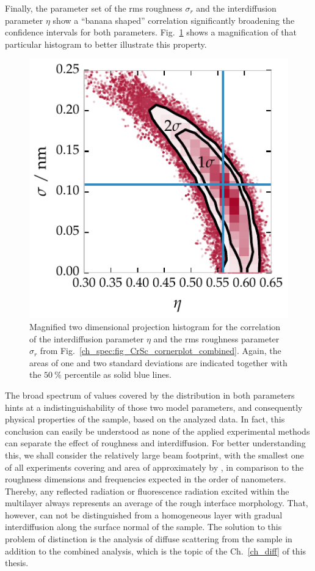 Finally, the parameter set of the \gls{rms} roughness $\sigma_r$ and the interdiffusion parameter $\eta$ show a ``banana shaped'' correlation significantly broadening the confidence intervals for both parameters. Fig.~\ref{ch_spec:fig_CrSc_eta_rho_correlation} shows a magnification of that particular histogram to better illustrate this property.
\begin{figure}[htbp]
  \centering
  \includegraphics{img/CrSc_eta_rho_correlation}
  \caption{Magnified two dimensional projection histogram for the correlation of the interdiffusion parameter $\eta$ and the \gls{rms} roughness parameter $\sigma_r$ from Fig.~\ref{ch_spec:fig_CrSc_cornerplot_combined}. Again, the areas of one and two standard deviations are indicated together with the $\SI{50}{\percent}$ percentile as solid blue lines.}
  \label{ch_spec:fig_CrSc_eta_rho_correlation}
\end{figure}
The broad spectrum of values covered by the distribution in both parameters hints at a indistinguishability of those two model parameters, and consequently physical properties of the sample, based on the analyzed data. In fact, this conclusion can easily be understood as none of the applied experimental methods can separate the effect of roughness and interdiffusion. For better understanding this, we shall consider the relatively large beam footprint, with the smallest one of all experiments covering and area of approximately  by , in comparison to the roughness dimensions and frequencies expected in the order of nanometers. Thereby, any reflected radiation or fluorescence radiation excited within the multilayer always represents an average of the rough interface morphology. That, however, can not be distinguished from a homogeneous layer with gradual interdiffusion along the surface normal of the sample. The solution to this problem of distinction is the analysis of diffuse scattering from the sample in addition to the combined analysis, which is the topic of the Ch.~\ref{ch_diff} of this thesis.

